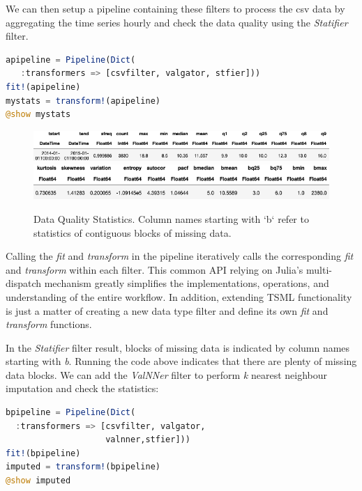 \documentclass{juliacon}
\begin{document}
We can then setup a pipeline containing these filters to process the csv data
by aggregating the time series hourly and check the data quality using the
\emph{Statifier} filter.

\begin{lstlisting}[language = Julia]
apipeline = Pipeline(Dict(
   :transformers => [csvfilter, valgator, stfier]))
fit!(apipeline)
mystats = transform!(apipeline)
@show mystats
\end{lstlisting}

\begin{figure}[htbp]
   \centering
   \includegraphics[width=\columnwidth]{stat1.png} %
   \vskip 2pt
      \includegraphics[width=\columnwidth]{stat2.png} %
   \caption{Data Quality Statistics. Column names starting with `b` refer to statistics of contiguous blocks of missing data.}
   \label{fig:dataquality}
\end{figure}

Calling the \emph{fit} and \emph{transform} in the pipeline
iteratively calls the corresponding \emph{fit} and \emph{transform} within each filter. 
This common API relying on Julia's multi-dispatch mechanism greatly simplifies the implementations, operations, 
and understanding of the entire workflow. In addition, extending TSML functionality is just a 
matter of creating a new data type filter and define its own  \emph{fit} and \emph{transform} 
functions.

In the \emph{Statifier} filter result, blocks of missing data is indicated by column names starting
with \emph{b}. Running the code above indicates that there are plenty of missing data blocks.
We can add the \emph{ValNNer} filter to perform \emph{k} nearest neighbour imputation and check
the statistics:

\begin{lstlisting}[language = Julia]
bpipeline = Pipeline(Dict(
  :transformers => [csvfilter, valgator, 
                    valnner,stfier]))
fit!(bpipeline)
imputed = transform!(bpipeline)
@show imputed
\end{lstlisting}
\end{document}
